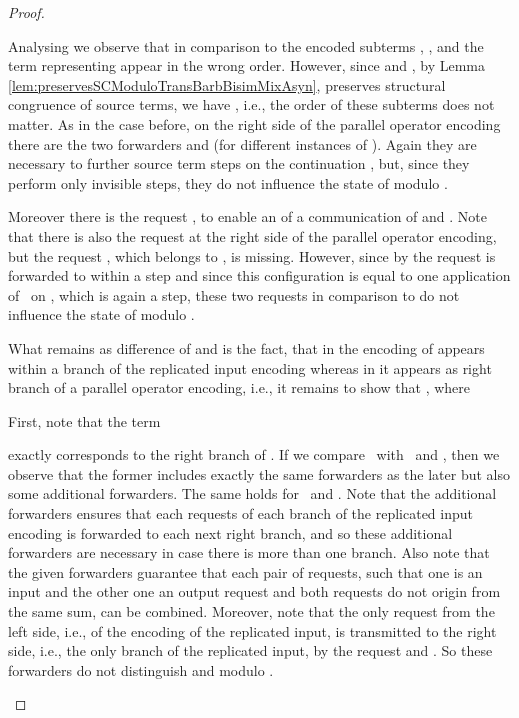 \documentclass[]{llncs}
\begin{document}
\begin{proof}
\begin{description}
\begin{description}
					Analysing  we observe that in comparison to  the encoded subterms , , and the term representing  appear in the wrong order. However, since  and , by Lemma \ref{lem:preservesSCModuloTransBarbBisimMixAsyn}, preserves structural congruence of source terms, we have , i.e., the order of these subterms does not matter. As in the case before, on the right side of the parallel operator encoding there are the two forwarders  and  (for different instances of ). Again they are necessary to \simulate further source term steps on the continuation , but, since they perform only invisible steps, they do not influence the state of  modulo .
					
					Moreover there is the request , to enable an \simulation of a communication of  and . Note that there is also the request  at the right side of the parallel operator encoding, but the request , which belongs to , is missing. However, since by  the request  is forwarded to  within a \pure \admin step and since this configuration is equal to one application of \processLeftInputRequests \ on , which is again a \pure \admin step, these two requests in comparison to  do not influence the state of  modulo .
					
					What remains as difference of  and  is the fact, that in  the encoding of  appears within a branch of the replicated input encoding whereas in  it appears as right branch of a parallel operator encoding, i.e., it remains to show that , where
					
					First, note that the term
					
					exactly corresponds to the right branch of . If we compare \pushRequestsIn \ with \processLeftOutputRequests \ and \processLeftInputRequests, then we observe that the former includes exactly the same forwarders as the later but also some additional forwarders. The same holds for \pushRequestsOut \ and \pushRequests. Note that the additional forwarders ensures that each requests of each branch of the replicated input encoding is forwarded to each next right branch, and so these additional forwarders are necessary in case there is more than one branch. Also note that the given forwarders guarantee that each pair of requests, such that one is an input and the other one an output request and both requests do not origin from the same sum, can be combined. Moreover, note that the only request from the left side, i.e., of the encoding of the replicated input, is transmitted to the right side, i.e., the only branch of the replicated input, by the request  and \pushRequestsIn. So these forwarders do not distinguish  and  modulo .
					

\end{description}
\end{description}
\end{proof}
\end{document}
